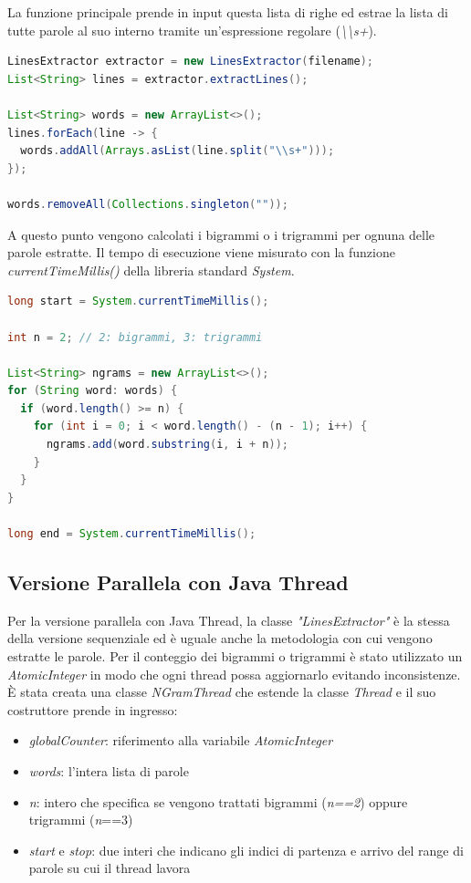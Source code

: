 \documentclass[10pt,twocolumn,letterpaper]{article}
\begin{document}
La funzione principale prende in input questa lista di righe ed estrae la lista di tutte parole al suo interno tramite un'espressione regolare (\textit{\textbackslash \textbackslash s+}). 
\begin{lstlisting}[basicstyle=\scriptsize, language=Java, frame=single, caption={Esempio di estrazione di parole},captionpos=b, showstringspaces=false]
LinesExtractor extractor = new LinesExtractor(filename);
List<String> lines = extractor.extractLines();

List<String> words = new ArrayList<>();
lines.forEach(line -> {
  words.addAll(Arrays.asList(line.split("\\s+")));
});

words.removeAll(Collections.singleton(""));
\end{lstlisting}

A questo punto vengono calcolati i bigrammi o i trigrammi per ognuna delle parole estratte. \newline
Il tempo di esecuzione viene misurato con la funzione \textit{currentTimeMillis()} della libreria standard \textit{System}.
\begin{lstlisting}[basicstyle=\scriptsize, language=Java, frame=single, caption={Esempio di ricerca di bigrammi/trigrammi},captionpos=b, showstringspaces=false]
long start = System.currentTimeMillis();

int n = 2; // 2: bigrammi, 3: trigrammi

List<String> ngrams = new ArrayList<>();
for (String word: words) {
  if (word.length() >= n) {
    for (int i = 0; i < word.length() - (n - 1); i++) {
      ngrams.add(word.substring(i, i + n));
    }
  }
}

long end = System.currentTimeMillis();
\end{lstlisting}

\subsection{Versione Parallela con Java Thread}
Per la versione parallela con Java Thread, la classe \textit{"LinesExtractor"} è la stessa della versione sequenziale ed è uguale anche la metodologia con cui vengono estratte le parole.\newline
Per il conteggio dei bigrammi o trigrammi è stato utilizzato un \textit{AtomicInteger} in modo che ogni thread possa aggiornarlo evitando inconsistenze.\newline
È stata creata una classe \textit{NGramThread} che estende la classe \textit{Thread} e il suo costruttore prende in ingresso:
\begin{itemize}
	\item \textit{globalCounter}: riferimento alla variabile \textit{AtomicInteger}
	\item \textit{words}: l'intera lista di parole
	\item \textit{n}: intero che specifica se vengono trattati bigrammi (\textit{n==2}) oppure trigrammi (\textit{n}==3)
	\item \textit{start} e \textit{stop}: due interi che indicano gli indici di partenza e arrivo del range di parole su cui il thread lavora
\end{itemize}
\end{document}
